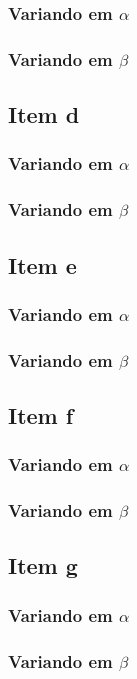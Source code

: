\documentclass[a4paper, 12pt]{article}
\begin{document}
			\subsubsection{Variando em $\alpha$}
			\subsubsection{Variando em $\beta$}	
		\subsection{Item d}		
			\subsubsection{Variando em $\alpha$}
			\subsubsection{Variando em $\beta$}	
		\subsection{Item e}		
			\subsubsection{Variando em $\alpha$}
			\subsubsection{Variando em $\beta$}	
		\subsection{Item f}					
			\subsubsection{Variando em $\alpha$}
			\subsubsection{Variando em $\beta$}
		\subsection{Item g}		
			\subsubsection{Variando em $\alpha$}
			\subsubsection{Variando em $\beta$}
\end{document}
